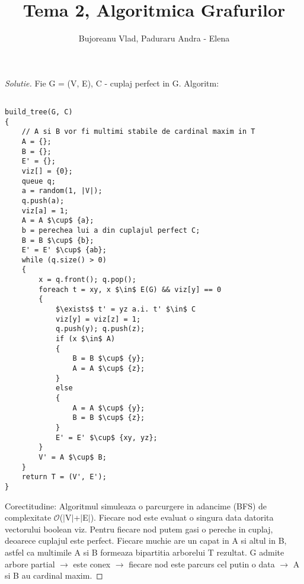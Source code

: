 \documentclass[12pt]{article}
\newenvironment{problema}[2][Problema]{\begin{trivlist}
\item[\hskip \labelsep {\bfseries #1}\hskip \labelsep {\bfseries #2.}]}{\end{trivlist}}
\begin{document}
 
\title{\textbf{Tema 2, Algoritmica Grafurilor}}
\author{
  Bujoreanu Vlad, Paduraru Andra - Elena\\
}
\date{}
\maketitle
 
\begin{problema}{1}
\end{problema}

\begin{proof}[Solutie]

Fie G = (V, E), C - cuplaj perfect in G.
\newline
Algoritm:
\begin{lstlisting}[mathescape]

build_tree(G, C)
{
    // A si B vor fi multimi stabile de cardinal maxim in T
    A = {};
    B = {};
    E' = {};
    viz[] = {0};
    queue q;
    a = random(1, |V|);
    q.push(a);
    viz[a] = 1;
    A = A $\cup$ {a};
    b = perechea lui a din cuplajul perfect C;
    B = B $\cup$ {b};
    E' = E' $\cup$ {ab};
    while (q.size() > 0)
    {
    	x = q.front(); q.pop();
    	foreach t = xy, x $\in$ E(G) && viz[y] == 0
    	{
    		$\exists$ t' = yz a.i. t' $\in$ C
    		viz[y] = viz[z] = 1;
    		q.push(y); q.push(z);
    		if (x $\in$ A)
    		{
    			B = B $\cup$ {y};
    			A = A $\cup$ {z};
    		}
    		else
    		{
    			A = A $\cup$ {y};
    			B = B $\cup$ {z};
    		}
    		E' = E' $\cup$ {xy, yz};
    	}
    	V' = A $\cup$ B;
    }
    return T = (V', E');
}
\end{lstlisting}

Corectitudine:
\newline
Algoritmul simuleaza o parcurgere in adancime (BFS) de complexitate $\mathcal{O}$($\vert$V$\vert$+$\vert$E$\vert$).
\newline
Fiecare nod este evaluat o singura data datorita vectorului boolean viz.
\newline
Pentru fiecare nod putem gasi o pereche in cuplaj, deoarece cuplajul este perfect.
\newline
Fiecare muchie are un capat in A si altul in B, astfel ca multimile A si B formeaza bipartitia arborelui T rezultat.
\newline
G admite arbore partial $\rightarrow$ este conex $\rightarrow$ fiecare nod este parcurs cel putin o data $\rightarrow$ A si B au cardinal maxim.

\end{proof}
\end{document}
